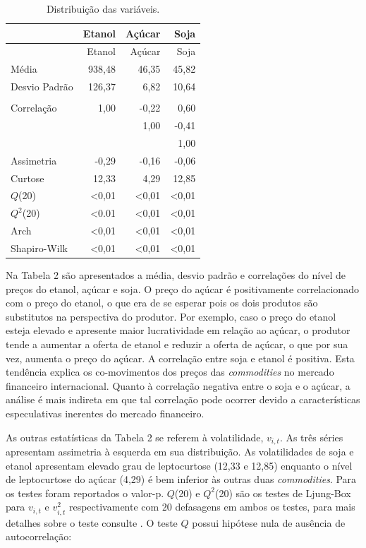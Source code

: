 \pagebreak

\begin{longtable}[]{@{}lrrr@{}}
\caption{Distribuição das variáveis.}\tabularnewline
\toprule
& Etanol & Açúcar & Soja\tabularnewline
\midrule
\endfirsthead
\toprule
& Etanol & Açúcar & Soja\tabularnewline
\midrule
\endhead
Média & 938,48 & 46,35 & 45,82\tabularnewline
Desvio Padrão & 126,37 & 6,82 & 10,64\tabularnewline
& & &\tabularnewline
Correlação & 1,00 & -0,22 & 0,60\tabularnewline
& & 1,00 & -0,41\tabularnewline
& & & 1,00\tabularnewline
Assimetria & -0,29 & -0,16 & -0,06\tabularnewline
Curtose & 12,33 & 4,29 & 12,85\tabularnewline
\(Q\)(20) & \textless{}0,01 & \textless{}0,01 &
\textless{}0,01\tabularnewline
\(Q^2\)(20) & \textless{}0.01 & \textless{}0,01 &
\textless{}0,01\tabularnewline
Arch & \textless{}0,01 & \textless{}0,01 &
\textless{}0,01\tabularnewline
Shapiro-Wilk & \textless{}0,01 & \textless{}0,01 &
\textless{}0,01\tabularnewline
\bottomrule
\end{longtable}

Na Tabela 2 são apresentados a média, desvio padrão e correlações do
nível de preços do etanol, açúcar e soja. O preço do açúcar é
positivamente correlacionado com o preço do etanol, o que era de se
esperar pois os dois produtos são substitutos na perspectiva do
produtor. Por exemplo, caso o preço do etanol esteja elevado e apresente
maior lucratividade em relação ao açúcar, o produtor tende a aumentar a
oferta de etanol e reduzir a oferta de açúcar, o que por sua vez,
aumenta o preço do açúcar. A correlação entre soja e etanol é positiva.
Esta tendência explica os co-movimentos dos preços das
\emph{commodities} no mercado financeiro internacional. Quanto à
correlação negativa entre o soja e o açúcar, a análise é mais indireta
em que tal correlação pode ocorrer devido a características especulativas
inerentes do mercado financeiro.

As outras estatísticas da Tabela 2 se referem à volatilidade,
\(v_{i,t}\). As três séries apresentam assimetria à esquerda em sua
distribuição. As volatilidades de soja e etanol apresentam elevado grau
de leptocurtose (12,33 e 12,85) enquanto o nível de leptocurtose do
açúcar (4,29) é bem inferior às outras duas \emph{commodities}. Para os
testes foram reportados o valor-p. \(Q\)(20) e \(Q^2\)(20) são os testes
de Ljung-Box para \(v_{i,t}\) e \(v_{i,t}^2\) respectivamente com 20
defasagens em ambos os testes, para mais detalhes sobre o teste consulte
. O teste \(Q\) possui hipótese nula de ausência de
autocorrelação:

